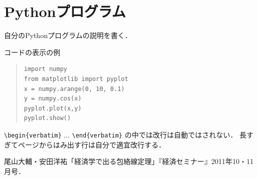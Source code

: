 \documentclass[11pt,a4j,fleqn]{jarticle}
\begin{document}
\section{Pythonプログラム}

自分のPythonプログラムの説明を書く．

コードの表示の例
\begin{quote}
\begin{verbatim}
import numpy
from matplotlib import pyplot
x = numpy.arange(0, 10, 0.1)
y = numpy.cos(x)
pyplot.plot(x,y)
pyplot.show()
\end{verbatim}
\end{quote}

\verb|\begin{verbatim}| ... \verb|\end{verbatim}| の中では改行は自動ではされない．
長すぎてページからはみ出す行は自分で適宜改行する．



\begin{thebibliography}{0}
尾山大輔・安田洋祐「経済学で出る包絡線定理」『経済セミナー』2011年10・11月号．
\end{thebibliography}
\end{document}
